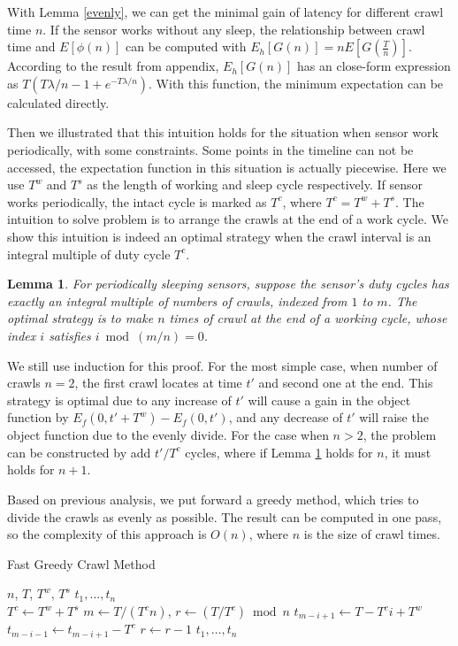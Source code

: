 \documentclass[conference]{IEEEtran}
\newtheorem{lemma}{Lemma}
\begin{document}
With Lemma \ref{evenly}, we can get the minimal gain of latency for different crawl time $n$.
If the sensor works without any sleep, the relationship between crawl time and $E[\phi(n)]$ can be computed with $E_h[G(n)]=nE[G(\frac{T}{n})]$.
According to the result from appendix, $E_h[G(n)]$ has an close-form expression as $T(T\lambda/n-1+e^{-T\lambda/n})$. 
With this function, the minimum expectation can be calculated directly.

Then we illustrated that this intuition holds for the situation when sensor work periodically, with some constraints.
Some points in the timeline can not be accessed, the expectation function in this situation is actually piecewise.
Here we use $T^{w}$ and $T^{s}$ as the length of working and sleep cycle respectively.
If sensor works periodically, the intact cycle is marked as $T^{c}$, where $T^{c}=T^{w}+T^{s}$.
The intuition to solve problem is to arrange the crawls at the end of a work cycle.
We show this intuition is indeed an optimal strategy when the crawl interval is an integral multiple of duty cycle $T^{c}$.
\begin{lemma}
\label{evenly_s}
For periodically sleeping sensors, suppose the sensor's duty cycles has exactly an integral multiple of numbers of crawls, indexed from $1$ to $m$.
The optimal strategy is to make $n$ times of crawl at the end of a working cycle, whose index $i$ satisfies $i \bmod (m/n)=0$.
\end{lemma}
\begin{IEEEproof}
We still use induction for this proof.
For the most simple case, when number of crawls $n=2$, the first crawl locates at time $t'$ and second one at the end. 
This strategy is optimal due to any increase of $t'$ will cause a gain in the object function by $E_f(0,t'+T^{w})-E_f(0,t')$, and any decrease of $t'$ will raise the object function due to the evenly divide.
For the case when $n>2$, the problem can be constructed by add $t'/T^{c}$ cycles, where if Lemma \ref{evenly_s} holds for $n$, it must holds for $n+1$.
\end{IEEEproof}

Based on previous analysis, we put forward a greedy method, which tries to divide the crawls as evenly as possible. 
The result can be computed in one pass, so the complexity of this approach is $O(n)$, where $n$ is the size of crawl times.
\begin{algorithm}
	\caption{Fast Greedy Crawl Method}
	\begin{algorithmic}[1]
		\renewcommand{\algorithmicrequire}{\textbf{Input:}}
		\renewcommand{\algorithmicensure}{\textbf{Output:}}
		\REQUIRE $n$, $T$, $T^w$, $T^s$
		\ENSURE  $t_1,\ldots,t_n$
		\\ 
		\STATE $T^{c} \gets T^{w}+T^{s}$
		\STATE $m \gets T/(T^{c} n)$, $r\gets (T/T^{c})\bmod{n}$
		\STATE $t_{m-i+1}\gets T- T^{c} i + T^{w}$
		\STATE $t_{m-i-1}\gets t_{m-i+1}-T^{c}$
		\STATE $r\gets r-1$
		\ENDIF
		\ENDFOR
		\RETURN $t_1,\ldots,t_n$
	\end{algorithmic} 
\end{algorithm}
\end{document}
